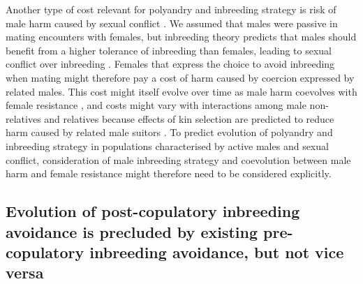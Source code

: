 \documentclass[10pt,letterpaper]{article}
\begin{document}
Another type of cost relevant for polyandry and inbreeding strategy is risk of male harm caused by sexual conflict \cite[e.g.,][]{Arnqvist2005a, Parker2006}. We assumed that males were passive in mating encounters with females, but inbreeding theory predicts that males should benefit from a higher tolerance of inbreeding than females, leading to sexual conflict over inbreeding \cite[][]{Parker1979, Parker2006, Kokko2006, Duthie2015a}. Females that express the choice to avoid inbreeding when mating might therefore pay a cost of harm caused by coercion expressed by related males. This cost might itself evolve over time as male harm coevolves with female resistance \cite[][]{Ronn2007, Perry2011, Wang2015a}, and costs might vary with interactions among male non-relatives and relatives because effects of kin selection are predicted to reduce harm caused by related male suitors \cite[][]{Rankin2011a}. To predict evolution of polyandry and inbreeding strategy in populations characterised by active males and sexual conflict, consideration of male inbreeding strategy and coevolution between male harm and female resistance might therefore need to be considered explicitly. 

\subsection*{Evolution of post-copulatory inbreeding avoidance is precluded by existing pre-copulatory inbreeding avoidance, but not vice versa}
\end{document}
